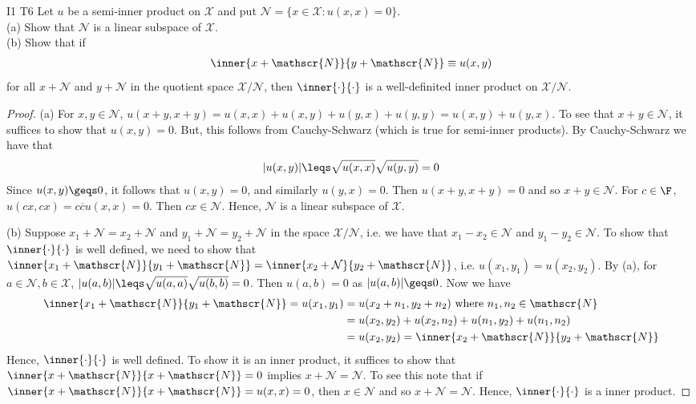 \begin{exercise}{I1 T6}{}
    Let $u$ be a semi-inner product on $\mathscr{X}$ and put $\mathscr{N}=\{x\in \mathscr{X}:u(x,x)=0\}$.\\
    (a) Show that $\mathscr{N}$ is a linear subspace of $\mathscr{X}$.\\
    (b) Show that if 
    \begin{align*}
        \inner{x+\mathscr{N}}{y+\mathscr{N}} \equiv u(x,y)
    \end{align*}
    for all $x+\mathscr{N}$ and $y+\mathscr{N}$ in the quotient space $\mathscr{X}/\mathcal{N}$,
    then $\inner{\cdot}{\cdot}$ is a well-definited inner product on $\mathscr{X}/\mathcal{N}$.
\end{exercise}
\begin{proof}
    (a) For $x,y\in \mathscr{N}$, $u(x+y,x+y)=u(x,x)+u(x,y)+u(y,x)+u(y,y)=u(x,y)+u(y,x)$.
    To see that $x+y\in\mathscr{N}$, it suffices to show that $u(x,y)=0$.
    But, this follows from Cauchy-Schwarz (which is true for semi-inner products).
    By Cauchy-Schwarz we have that 
    \begin{align*}
        |u(x,y)|\leqs \sqrt{u(x,x)}\sqrt{u(y,y)}=0
    \end{align*}
    Since $u(x,y)\geqs 0$, it follows that $u(x,y)=0$,
    and similarly $u(y,x)=0$. Then $u(x+y,x+y)=0$ and so $x+y\in\mathscr{N}$.
    For $c\in\F$, $u(cx,cx)=c\overline{c}u(x,x)=0$. Then $cx\in \mathscr{N}$.
    Hence, $\mathscr{N}$ is a linear subspace of $\mathscr{X}$.
    \par
    (b) Suppose $x_1+\mathscr{N}=x_2+\mathscr{N}$ and $y_1+\mathscr{N}=y_2+\mathscr{N}$ in the space $\mathscr{X}/\mathscr{N}$, 
    i.e. we have that $x_1-x_2\in \mathscr{N}$ and $y_1-y_2\in\mathscr{N}$.
    To show that $\inner{\cdot}{\cdot}$ is well defined, we need to show that 
    $\inner{x_1+\mathscr{N}}{y_1+\mathscr{N}}=\inner{x_2+\mathcal{N}}{y_2+\mathscr{N}}$, 
    i.e. $u(x_1,y_1)=u(x_2,y_2)$. By (a), for $a\in\mathscr{N},b\in\mathscr{X}$, $|u(a,b)|\leqs \sqrt{u(a,a)}\sqrt{u(b,b)}=0$. 
    Then $u(a,b)=0$ as $|u(a,b)|\geqs 0$. Now we have 
    \begin{align*}
        \inner{x_1+\mathscr{N}}{y_1+\mathscr{N}} = u(x_1,y_1) &= u(x_2+n_1,y_2+n_2) \text{ where } n_1,n_2\in \mathscr{N}\\
                                                              &= u(x_2,y_2) + u(x_2,n_2) + u(n_1,y_2) + u(n_1,n_2)\\
                                                              &= u(x_2,y_2) =  \inner{x_2+\mathscr{N}}{y_2+\mathscr{N}}
    \end{align*}
    Hence, $\inner{\cdot}{\cdot}$ is well defined.
    To show it is an inner product, it suffices to show that 
    $\inner{x+\mathscr{N}}{x+\mathscr{N}}=0$ implies $x+\mathscr{N}=\mathscr{N}$.
    To see this note that if $\inner{x+\mathscr{N}}{x+\mathscr{N}}=u(x,x)=0$, then $x\in\mathscr{N}$ and so $x+\mathscr{N}=\mathscr{N}$. 
    Hence, $\inner{\cdot}{\cdot}$ is a inner product.
    
\end{proof}

